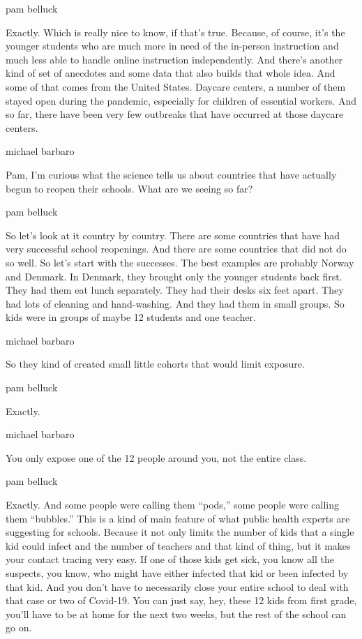 pam belluck

Exactly. Which is really nice to know, if that's true. Because, of
course, it's the younger students who are much more in need of the
in-person instruction and much less able to handle online instruction
independently. And there's another kind of set of anecdotes and some
data that also builds that whole idea. And some of that comes from the
United States. Daycare centers, a number of them stayed open during the
pandemic, especially for children of essential workers. And so far,
there have been very few outbreaks that have occurred at those daycare
centers.

michael barbaro

Pam, I'm curious what the science tells us about countries that have
actually begun to reopen their schools. What are we seeing so far?

pam belluck

So let's look at it country by country. There are some countries that
have had very successful school reopenings. And there are some countries
that did not do so well. So let's start with the successes. The best
examples are probably Norway and Denmark. In Denmark, they brought only
the younger students back first. They had them eat lunch separately.
They had their desks six feet apart. They had lots of cleaning and
hand-washing. And they had them in small groups. So kids were in groups
of maybe 12 students and one teacher.

michael barbaro

So they kind of created small little cohorts that would limit exposure.

pam belluck

Exactly.

michael barbaro

You only expose one of the 12 people around you, not the entire class.

pam belluck

Exactly. And some people were calling them ``pods,'' some people were
calling them ``bubbles.'' This is a kind of main feature of what public
health experts are suggesting for schools. Because it not only limits
the number of kids that a single kid could infect and the number of
teachers and that kind of thing, but it makes your contact tracing very
easy. If one of those kids get sick, you know all the suspects, you
know, who might have either infected that kid or been infected by that
kid. And you don't have to necessarily close your entire school to deal
with that case or two of Covid-19. You can just say, hey, these 12 kids
from first grade, you'll have to be at home for the next two weeks, but
the rest of the school can go on.

